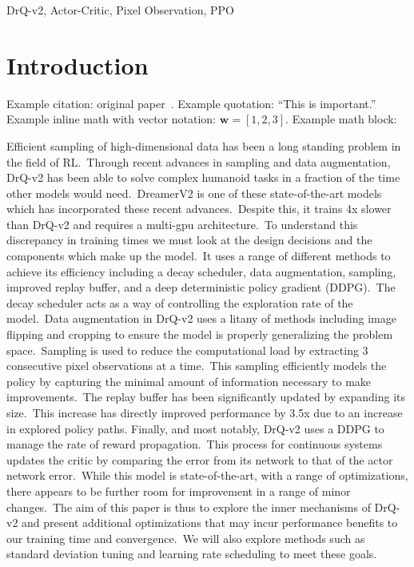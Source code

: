 \documentclass[conference]{./IEEEtran/IEEEtran} %
\begin{document}
    \begin{IEEEkeywords}
        DrQ-v2, Actor-Critic, Pixel Observation, PPO
    \end{IEEEkeywords}

    \section{Introduction}\label{sec:introduction}

    Example citation: original paper~\cite{yarats2021image}.
    Example quotation: \enquote{This is important.}
    Example inline math with vector notation: \(\mathbf{w} = [1, 2, 3]\).
    Example math block:

    Efficient sampling of high-dimensional data has been a long standing problem in the field of RL.\ Through recent advances in
    sampling and data augmentation, DrQ-v2 has been able to solve complex humanoid tasks in a fraction of the time other models
    would need.\ DreamerV2 \cite{DreamerV2} is one of these state-of-the-art models which has incorporated these recent advances.\
    Despite this, it trains 4x slower than DrQ-v2 and requires a multi-gpu architecture.\ To understand this discrepancy in training
    times we must look at the design decisions and the components which make up the model.\ It uses a range of different methods
    to achieve its efficiency including a decay scheduler, data augmentation, sampling, improved replay buffer, and a deep
    deterministic policy gradient (DDPG).\
    The decay scheduler acts as a way of controlling the exploration rate of the model.\ Data augmentation in DrQ-v2 uses a litany
    of methods including image flipping and cropping to ensure the model is properly generalizing the problem space.\ Sampling is
    used to reduce the computational load by extracting 3 consecutive pixel observations at a time.\ This sampling efficiently
    models the policy by capturing the minimal amount of information necessary to make improvements.\ The replay buffer has been
    significantly updated  by expanding its size.\ This increase has directly improved performance by 3.5x due to an increase in
    explored policy paths. Finally, and most notably, DrQ-v2 uses a DDPG to manage the rate of reward propagation.\ This process
    for continuous systems  updates the critic by comparing the error from its network to that of the actor network error.\
    While this model is state-of-the-art, with a range of optimizations, there appears to be further room for improvement in a
    range of minor changes.\ The aim of this paper is thus to explore the inner mechanisms of DrQ-v2 and present additional
    optimizations that may incur performance benefits to our training time and convergence.\ We will also explore methods such
    as standard deviation tuning and learning rate scheduling to meet these goals.\
\end{document}
